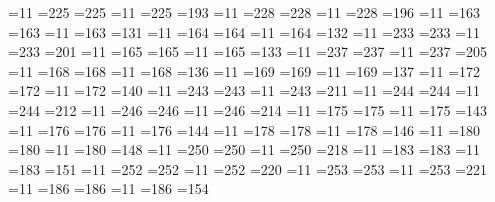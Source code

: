=11 =225 =225  %
=11 =225 =193  %
=11 =228 =228  %
=11 =228 =196  %
=11 =163 =163  %
=11 =163 =131  %
=11 =164 =164  %
=11 =164 =132  %
=11 =233 =233  %
=11 =233 =201  %
=11 =165 =165  %
=11 =165 =133  %
=11 =237 =237  %
=11 =237 =205  %
=11 =168 =168  %
=11 =168 =136  %
=11 =169 =169  %
=11 =169 =137  %
=11 =172 =172  %
=11 =172 =140  %
=11 =243 =243  %
=11 =243 =211  %
=11 =244 =244  %
=11 =244 =212  %
=11 =246 =246  %
=11 =246 =214  %
=11 =175 =175  %
=11 =175 =143  %
=11 =176 =176  %
=11 =176 =144  %
=11 =178 =178  %
=11 =178 =146  %
=11 =180 =180  %
=11 =180 =148  %
=11 =250 =250  %
=11 =250 =218  %
=11 =183 =183  %
=11 =183 =151  %
=11 =252 =252  %
=11 =252 =220  %
=11 =253 =253  %
=11 =253 =221  %
=11 =186 =186  %
=11 =186 =154  %
					                       
